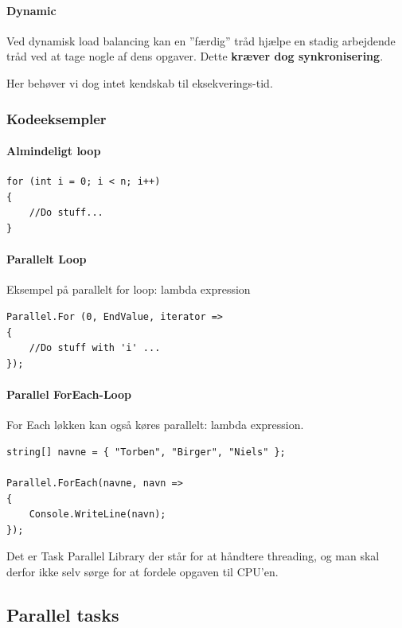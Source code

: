 \paragraph{Dynamic}
Ved dynamisk load balancing kan en ''færdig'' tråd hjælpe en stadig arbejdende tråd ved at tage nogle af dens opgaver. Dette \textbf{kræver dog synkronisering}.

Her behøver vi dog intet kendskab til eksekverings-tid.

\subsubsection{Kodeeksempler}
\paragraph{Almindeligt loop}
\begin{lstlisting}[caption=Normal for loop, label=code:normalLoop]
for (int i = 0; i < n; i++)
{
	//Do stuff...
}
\end{lstlisting}
\paragraph{Parallelt Loop}
Eksempel på parallelt for loop: lambda expression
\begin{lstlisting}[caption=Parallel for loop,  label=code:paraLoop,
morekeywords={Parallel, For}]
Parallel.For (0, EndValue, iterator =>
{
	//Do stuff with 'i' ...
});
\end{lstlisting}
\paragraph{Parallel ForEach-Loop}
For Each løkken kan også køres parallelt: lambda expression.
\begin{lstlisting}[caption=Parallelt for each loop, label=paraForEach,morekeywords={string,Parallel, ForEach, WriteLine}]
string[] navne = { "Torben", "Birger", "Niels" };

Parallel.ForEach(navne, navn =>
{
	Console.WriteLine(navn);
});
\end{lstlisting}
Det er Task Parallel Library der står for at håndtere threading, og man skal derfor ikke selv sørge for at fordele opgaven til CPU'en. 

\subsection{Parallel tasks}

